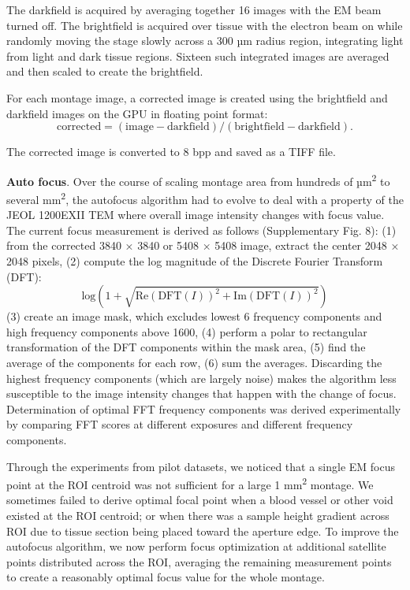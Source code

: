 \documentclass{article}
\begin{document}
{The darkfield is acquired by averaging together 16 images with the EM beam turned off. The brightfield is acquired over tissue with the electron beam on while randomly moving the stage slowly across a 300 µm radius region, integrating light from light and dark tissue regions. Sixteen such integrated images are averaged and then scaled to create the brightfield.

For each montage image, a corrected image is created using the brightfield and darkfield images on the GPU in floating point format:
\begin{equation*}
\mathrm{corrected} = (\mathrm{image} - \mathrm{darkfield})/(\mathrm{brightfield} - \mathrm{darkfield}). \tag{1}
\end{equation*}

The corrected image is converted to 8 bpp and saved as a TIFF file.

\noindent\textbf{Auto focus}. Over the course of scaling montage area from hundreds of µm\textsuperscript{2} to several mm\textsuperscript{2}, the autofocus algorithm had to evolve to deal with a property of the JEOL 1200EXII TEM where overall image intensity changes with focus value. The current focus measurement is derived as follows (Supplementary Fig. 8): (1) from the corrected 3840 × 3840 or 5408 × 5408 image, extract the center 2048 × 2048 pixels, (2) compute the log magnitude of the Discrete Fourier Transform (DFT):
\begin{equation*}
\mathrm{log}\left(1 + \sqrt{\mathrm{Re}(\mathrm{DFT}(I))^2 + \mathrm{Im}(\mathrm{DFT}(I))^2}\right) \tag{2}
\end{equation*}
(3) create an image mask, which excludes lowest 6 frequency components and high frequency components above 1600, (4) perform a polar to rectangular transformation of the DFT components within the mask area, (5) find the average of the components for each row, (6) sum the averages. Discarding the highest frequency components (which are largely noise) makes the algorithm less susceptible to the image intensity changes that happen with the change of focus. Determination of optimal FFT frequency components was derived experimentally by comparing FFT scores at different exposures and different frequency components.

Through the experiments from pilot datasets, we noticed that a single EM focus point at the ROI centroid was not sufficient for a large 1 mm\textsuperscript{2} montage. We sometimes failed to derive optimal focal point when a blood vessel or other void existed at the ROI centroid; or when there was a sample height gradient across ROI due to tissue section being placed toward the aperture edge. To improve the autofocus algorithm, we now perform focus optimization at additional satellite points distributed across the ROI, averaging the remaining measurement points to create a reasonably optimal focus value for the whole montage.

}
\end{document}
